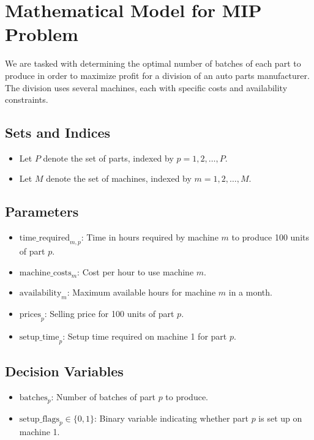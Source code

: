 \documentclass{article}
\begin{document}
\section*{Mathematical Model for MIP Problem}

We are tasked with determining the optimal number of batches of each part to produce in order to maximize profit for a division of an auto parts manufacturer. The division uses several machines, each with specific costs and availability constraints.

\subsection*{Sets and Indices}
\begin{itemize}
    \item Let \( P \) denote the set of parts, indexed by \( p = 1, 2, \ldots, P \).
    \item Let \( M \) denote the set of machines, indexed by \( m = 1, 2, \ldots, M \).
\end{itemize}

\subsection*{Parameters}
\begin{itemize}
    \item \( \text{time\_required}_{m,p} \): Time in hours required by machine \( m \) to produce 100 units of part \( p \).
    \item \( \text{machine\_costs}_{m} \): Cost per hour to use machine \( m \).
    \item \( \text{availability}_{m} \): Maximum available hours for machine \( m \) in a month.
    \item \( \text{prices}_{p} \): Selling price for 100 units of part \( p \).
    \item \( \text{setup\_time}_{p} \): Setup time required on machine 1 for part \( p \).
\end{itemize}

\subsection*{Decision Variables}
\begin{itemize}
    \item \( \text{batches}_{p} \): Number of batches of part \( p \) to produce.
    \item \( \text{setup\_flags}_{p} \in \{0, 1\} \): Binary variable indicating whether part \( p \) is set up on machine 1.
\end{itemize}
\end{document}
